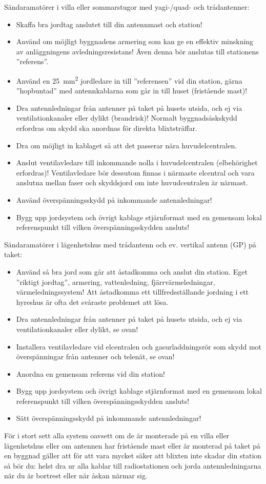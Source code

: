 Sändaramatörer i villa eller sommarstugor med yagi-/quad- och trådantenner:
\begin{itemize}
    \item Skaffa bra jordtag anslutet till din antennmast och station!
    \item Använd om möjligt byggnadens armering som kan ge en effektiv minskning av anläggningens avledningsresistans! Även denna bör anslutas till stationens ''referens''.
    \item Använd en \qty{25}{\milli\metre\squared} jordledare in till ''referensen'' vid din station, gärna ''hopbuntad'' med antennkablarna som går in till huset (fristående mast)!
    \item Dra antennledningar från antenner på taket på husets utsida, och ej via ventilationkanaler eller dylikt (brandrisk)! Normalt byggnadsåskskydd erfordras om skydd ska anordnas för direkta blixtsträffar.
    \item Dra om möjligt in kablaget så att det passerar nära huvudelcentralen.
    \item Anslut ventilavledare till inkommande nolla i huvudelcentralen (elbehörighet erfordras)! Ventilavledare bör dessutom finnas i närmaste elcentral och vara anslutna mellan faser och skyddsjord om inte huvudcentralen är närmast.
    \item Använd överspänningsskydd på inkommande antennledningar!
    \item Bygg upp jordsystem och övrigt kablage stjärnformat med en gemensam lokal referenspunkt till vilken överspänningsskydden ansluts!
\end{itemize}

Sändaramatörer i lägenhetshus med trådantenn och ev. vertikal antenn (GP) på taket:
\begin{itemize}
    \item Använd så bra jord som går att åstadkomma och anslut din station. Eget ''riktigt jordtag'', armering, vattenledning, fjärrvärmeledningar, värmeledningssystem! Att åstadkomma ett tillfredsställande jordning i ett hyreshus är ofta det svåraste problemet att lösa.
    \item Dra antennledningar från antenner på taket på husets utsida, och ej via ventilationkanaler eller dylikt, se ovan!
    \item Installera ventilavledare vid elcentralen och gasurladdningsrör som skydd mot överspänningar från antenner och telenät, se ovan!
    \item Anordna en gemensam referens vid din station!
    \item Bygg upp jordsystem och övrigt kablage stjärnformat med en gemensam lokal referenspunkt till vilken överspänningsskydden ansluts!
    \item Sätt överspänningsskydd på inkommande antennledningar!
\end{itemize}

För i stort sett alla system oavsett om de är monterade på en villa eller
lägenhetshus eller om antennen har fristående mast eller är monterad på taket på
en byggnad gäller att för att vara mycket säker att blixten inte skadar din
station så bör du: helst dra ur alla kablar till radiostationen och jorda
antennledningarna när du är bortrest eller när åskan närmar sig.
